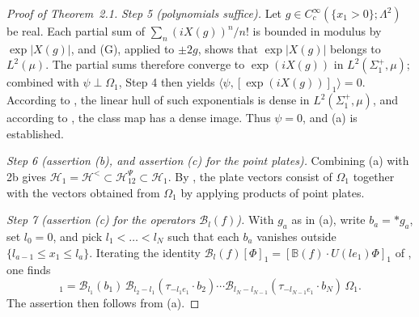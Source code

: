 \documentclass[11pt]{amsart}
\theoremstyle{definition}
\begin{document}
\begin{proof}[Proof of Theorem~2.1]
\emph{Step 5 (polynomials suffice).}
Let $g\in C_c^\infty(\{x_1>0\};\Lambda^2)$ be real.
Each partial sum of $\sum_n(iX(g))^n/n!$ is bounded in modulus by $\exp|X(g)|$, and (G), applied to $\pm2g$, shows that $\exp|X(g)|$ belongs to $L^2(\mu)$.
The partial sums therefore converge to $\exp(iX(g))$ in $L^2(\Sigma_1^+,\mu)$; combined with $\psi\perp\Omega_1$, Step 4 then yields $\langle\psi,[\exp(iX(g))]_1\rangle=0$.
According to \cite[Lemma~8.12\,(i)]{QEDI}, the linear hull of such exponentials is dense in $L^2(\Sigma_1^+,\mu)$, and according to \cite[Proposition~8.19\,(i)]{QEDI}, the class map has a dense image.
Thus $\psi=0$, and (a) is established.

\emph{Step 6 (assertion (b), and assertion (c) for the point plates).}
Combining (a) with 2b gives $\mathcal H_1=\allowbreak \mathcal H^{<}\subset\mathcal H^{\Psi}_{12}\subset\mathcal H_1$.
By \cite[Definition~14.21]{QEDII}, the plate vectors consist of $\Omega_1$ together with the vectors obtained from $\Omega_1$ by applying products of point plates.

\emph{Step 7 (assertion (c) for the operators $\mathcal B_l(f)$).}
With $g_a$ as in (a), write $b_a=\ast g_a$, set $l_0=0$, and pick $l_1<\dots<l_N$ such that each $b_a$ vanishes outside $\{l_{a-1}\le x_1\le l_a\}$.
Iterating the identity $\mathcal B_l(f)[\Phi]_1=[\mathbb B(f)\cdot U(le_1)\Phi]_1$ of \cite[Proposition~14.16]{QEDII}, one finds
\begin{equation*}
[X(g_1)\cdots X(g_N)]_1=\mathcal B_{l_1}(b_1)\,\mathcal B_{l_2-l_1}(\tau_{-l_1e_1}\cdot b_2)\cdots\mathcal B_{l_N-l_{N-1}}(\tau_{-l_{N-1}e_1}\cdot b_N)\,\Omega_1.
\end{equation*}
The assertion then follows from (a).
\end{proof}
\end{document}

